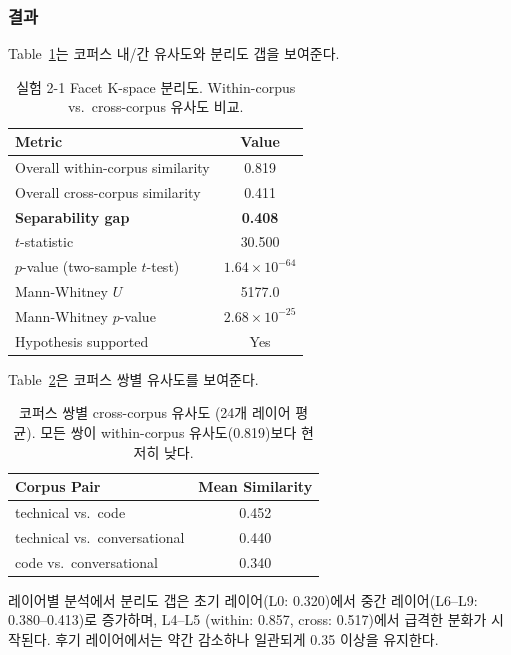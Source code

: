 \documentclass[11pt,a4paper]{article}
\begin{document}
\subsubsection{결과}

Table~\ref{tab:sep}는 코퍼스 내/간 유사도와 분리도 갭을 보여준다.

\begin{table}[H]
\centering
\caption{실험 2-1 Facet K-space 분리도. Within-corpus vs.\ cross-corpus 유사도 비교.}
\label{tab:sep}
\begin{tabular}{lc}
\toprule
\textbf{Metric} & \textbf{Value} \\
\midrule
Overall within-corpus similarity & 0.819 \\
Overall cross-corpus similarity & 0.411 \\
\textbf{Separability gap} & \textbf{0.408} \\
$t$-statistic & 30.500 \\
$p$-value (two-sample $t$-test) & $1.64 \times 10^{-64}$ \\
Mann-Whitney $U$ & 5177.0 \\
Mann-Whitney $p$-value & $2.68 \times 10^{-25}$ \\
Hypothesis supported & \textcolor{success}{Yes} \\
\bottomrule
\end{tabular}
\end{table}

Table~\ref{tab:pair_sim}은 코퍼스 쌍별 유사도를 보여준다.

\begin{table}[H]
\centering
\caption{코퍼스 쌍별 cross-corpus 유사도 (24개 레이어 평균). 모든 쌍이 within-corpus 유사도(0.819)보다 현저히 낮다.}
\label{tab:pair_sim}
\begin{tabular}{lc}
\toprule
\textbf{Corpus Pair} & \textbf{Mean Similarity} \\
\midrule
technical vs.\ code & 0.452 \\
technical vs.\ conversational & 0.440 \\
code vs.\ conversational & 0.340 \\
\bottomrule
\end{tabular}
\end{table}

레이어별 분석에서 분리도 갭은 초기 레이어(L0: 0.320)에서 중간 레이어(L6--L9: 0.380--0.413)로 증가하며, L4--L5 (within: 0.857, cross: 0.517)에서 급격한 분화가 시작된다.
후기 레이어에서는 약간 감소하나 일관되게 0.35 이상을 유지한다.
\end{document}
